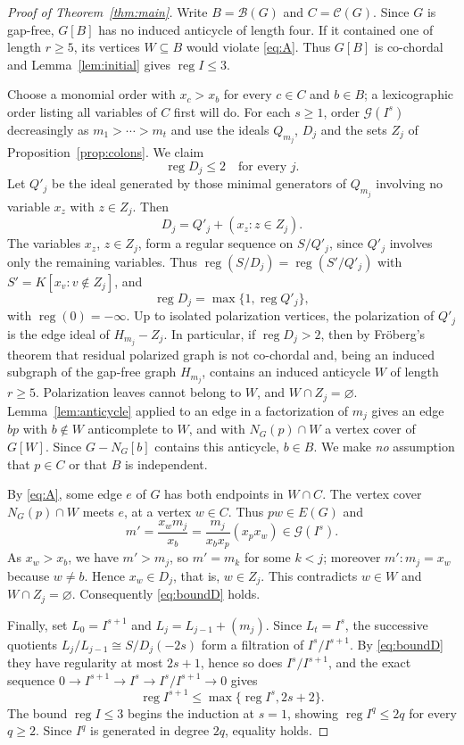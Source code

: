\documentclass[11pt,a4paper]{article}
\theoremstyle{remark}\newtheorem{remark}[theorem]{Remark}
\newcommand{\reg}{\operatorname{reg}}
\newcommand{\GG}{\mathcal G}
\newcommand{\Bad}{\mathcal B}
\newcommand{\Good}{\mathcal C}
\begin{document}
\begin{proof}[Proof of Theorem~\ref{thm:main}]
Write $B=\Bad(G)$ and $C=\Good(G)$. Since $G$ is gap-free, $G[B]$ has no induced anticycle of length four. If it contained one of length $r\ge5$, its vertices $W\subseteq B$ would violate \eqref{eq:A}. Thus $G[B]$ is co-chordal and Lemma~\ref{lem:initial} gives $\reg I\le3$.

Choose a monomial order with $x_c>x_b$ for every $c\in C$ and $b\in B$; a lexicographic order listing all variables of $C$ first will do. For each $s\ge1$, order $\GG(I^s)$ decreasingly as $m_1>\cdots>m_t$ and use the ideals $Q_{m_j}$, $D_j$ and the sets $Z_j$ of Proposition~\ref{prop:colons}. We claim
\begin{equation}\label{eq:boundD}\reg D_j\le2\quad\text{for every }j.\end{equation}
Let $Q'_j$ be the ideal generated by those minimal generators of $Q_{m_j}$ involving no variable $x_z$ with $z\in Z_j$. Then
\[
 D_j=Q'_j+(x_z:z\in Z_j).
\]
The variables $x_z$, $z\in Z_j$, form a regular sequence on $S/Q'_j$, since $Q'_j$ involves only the remaining variables. Thus $\reg(S/D_j)=\reg(S'/Q'_j)$ with $S'=K[x_v:v\notin Z_j]$, and
\[
 \reg D_j=\max\{1,\reg Q'_j\},
\]
with $\reg(0)=-\infty$. Up to isolated polarization vertices, the polarization of $Q'_j$ is the edge ideal of $H_{m_j}-Z_j$. In particular, if $\reg D_j>2$, then by Fr\"oberg's theorem that residual polarized graph is not co-chordal and, being an induced subgraph of the gap-free graph $H_{m_j}$, contains an induced anticycle $W$ of length $r\ge5$. Polarization leaves cannot belong to $W$, and $W\cap Z_j=\varnothing$. Lemma~\ref{lem:anticycle} applied to an edge in a factorization of $m_j$ gives an edge $bp$ with $b\notin W$ anticomplete to $W$, and with $N_G(p)\cap W$ a vertex cover of $G[W]$. Since $G-N_G[b]$ contains this anticycle, $b\in B$. We make \emph{no} assumption that $p\in C$ or that $B$ is independent.

By \eqref{eq:A}, some edge $e$ of $G$ has both endpoints in $W\cap C$. The vertex cover $N_G(p)\cap W$ meets $e$, at a vertex $w\in C$. Thus $pw\in E(G)$ and
\[
 m'=\frac{x_wm_j}{x_b}=\frac{m_j}{x_bx_p}(x_px_w)\in\GG(I^s).
\]
As $x_w>x_b$, we have $m'>m_j$, so $m'=m_k$ for some $k<j$; moreover $m':m_j=x_w$ because $w\ne b$. Hence $x_w\in D_j$, that is, $w\in Z_j$. This contradicts $w\in W$ and $W\cap Z_j=\varnothing$. Consequently \eqref{eq:boundD} holds.

Finally, set $L_0=I^{s+1}$ and $L_j=L_{j-1}+(m_j)$. Since $L_t=I^s$, the successive quotients $L_j/L_{j-1}\cong S/D_j(-2s)$ form a filtration of $I^s/I^{s+1}$. By \eqref{eq:boundD} they have regularity at most $2s+1$, hence so does $I^s/I^{s+1}$, and the exact sequence $0\to I^{s+1}\to I^s\to I^s/I^{s+1}\to0$ gives
\[
 \reg I^{s+1}\le\max\{\reg I^s,2s+2\}.
\]
The bound $\reg I\le3$ begins the induction at $s=1$, showing $\reg I^q\le2q$ for every $q\ge2$. Since $I^q$ is generated in degree $2q$, equality holds.
\end{proof}
\end{document}
